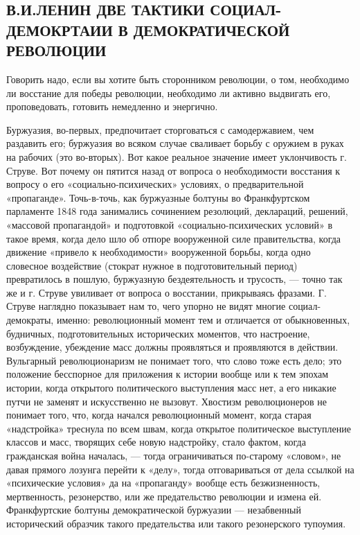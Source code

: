 \documentclass[12pt]{article}
\newcommand{\parnum}{(\arabic{parcount})}
\newcounter{parcount}
\newenvironment{parnumbers}{%
  \par%
  \everypar{\noindent \stepcounter{parcount}\marginpar[]{\parnum}}%
}{}
\begin{document}
\subsection{В.И.ЛЕНИН  ДВЕ ТАКТИКИ СОЦИАЛ-ДЕМОКРТАИИ В ДЕМОКРАТИЧЕСКОЙ РЕВОЛЮЦИИ}
\begin{parnumbers}
Говорить надо, если вы хотите быть сторонником революции, о том, необходимо ли восстание для победы революции, необходимо ли активно выдвигать его, проповедовать, готовить немедленно и энергично.

Буржуазия, во-первых, предпочитает сторговаться с самодержавием, чем раздавить его; буржуазия во всяком случае сваливает борьбу с оружием в руках на рабочих (это во-вторых). Вот какое реальное значение имеет уклончивость г. Струве. Вот почему он пятится назад от вопроса о необходимости восстания к вопросу о его «социально-психических» условиях, о предварительной «пропаганде». Точь-в-точь, как буржуазные болтуны во Франкфуртском парламенте 1848 года занимались сочинением резолюций, деклараций, решений, «массовой пропагандой» и подготовкой «социально-психических условий» в такое время, когда дело шло об отпоре вооруженной силе правительства, когда движение «привело к необходимости» вооруженной борьбы, когда одно словесное воздействие (стократ нужное в подготовительный период) превратилось в пошлую, буржуазную бездеятельность и трусость, — точно так же и г. Струве увиливает от вопроса о восстании, прикрываясь фразами. Г. Струве наглядно показывает нам то, чего упорно не видят многие социал-демократы, именно: революционный момент тем и отличается от обыкновенных, будничных, подготовительных исторических моментов, что настроение, возбуждение, убеждение масс должны проявляться и проявляются в действии. Вульгарный революционаризм не понимает того, что слово тоже есть дело; это положение бесспорное для приложения к истории вообще или к тем эпохам истории, когда открытого политического выступления масс нет, а его никакие путчи не заменят и искусственно не вызовут. Хвостизм революционеров не понимает того, что, когда начался революционный момент, когда старая «надстройка» треснула по всем швам, когда открытое политическое выступление классов и масс, творящих себе новую надстройку, стало фактом, когда гражданская война началась, — тогда ограничиваться по-старому «словом», не давая прямого лозунга перейти к «делу», тогда отговариваться от дела ссылкой на «психические условия» да на «пропаганду» вообще есть безжизненность, мертвенность, резонерство, или же предательство революции и измена ей. Франкфуртские болтуны демократической буржуазии — незабвенный исторический образчик такого предательства или такого резонерского тупоумия.


\end{parnumbers}
\end{document}
